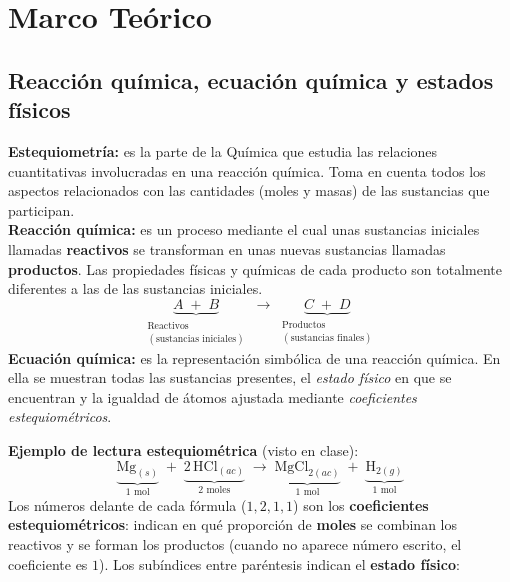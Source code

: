 \documentclass[12pt, letterpaper]{article}
\begin{document}
\vspace{4pt}

\newpage
\section{Marco Teórico}

\subsection{Reacción química, ecuación química y estados físicos}

\begin{cuadroteoria}[nobreak=true]
  \textbf{Estequiometría:} es la parte de la Química que estudia las relaciones cuantitativas involucradas en una reacción química. Toma en cuenta todos los aspectos relacionados con las cantidades (moles y masas) de las sustancias que participan.\\[4pt]
  \textbf{Reacción química:} es un proceso mediante el cual unas sustancias iniciales llamadas \textbf{reactivos} se transforman en unas nuevas sustancias llamadas \textbf{productos}. Las propiedades físicas y químicas de cada producto son totalmente diferentes a las de las sustancias iniciales.
  \[
    \underbrace{A \;+\; B}_{\substack{\text{Reactivos}\\(\text{sustancias iniciales})}}
    \;\longrightarrow\;
    \underbrace{C \;+\; D}_{\substack{\text{Productos}\\(\text{sustancias finales})}}
  \]
  \textbf{Ecuación química:} es la representación simbólica de una reacción química. En ella se muestran todas las sustancias presentes, el \emph{estado físico} en que se encuentran y la igualdad de átomos ajustada mediante \emph{coeficientes estequiométricos}.
\end{cuadroteoria}

\noindent\textbf{Ejemplo de lectura estequiométrica} (visto en clase):
\[
  \underbrace{\text{Mg}_{(s)}}_{1\text{ mol}} \;+\; \underbrace{2\,\text{HCl}_{(ac)}}_{2\text{ moles}}
  \;\longrightarrow\;
  \underbrace{\text{MgCl}_{2(ac)}}_{1\text{ mol}} \;+\; \underbrace{\text{H}_{2(g)}}_{1\text{ mol}}
\]
Los números delante de cada fórmula ($1, 2, 1, 1$) son los \textbf{coeficientes estequiométricos}: indican en qué proporción de \textbf{moles} se combinan los reactivos y se forman los productos (cuando no aparece número escrito, el coeficiente es $1$). Los subíndices entre paréntesis indican el \textbf{estado físico}:
\end{document}
